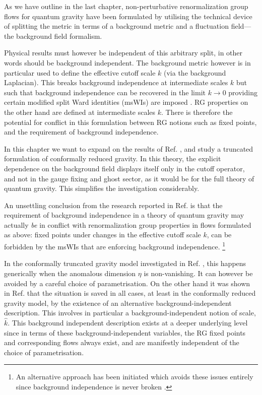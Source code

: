 \documentclass[11pt]{book} %
\numberwithin{equation}{chapter}
\begin{document}
As we have outline in the last chapter,
non-perturbative renormalization group flows for quantum gravity \cite{Reuter:1996cp}
have been formulated by utilising the technical device of splitting the metric in terms
of a background metric and a fluctuation field---the background field formalism.

Physical results must however be independent of this arbitrary split,
in other words should be background independent.
The background metric however is in particular used
to define the effective cutoff scale $k$ (via the background Laplacian).
This breaks background independence at intermediate scales $k$ but such that background
independence can be recovered in the limit $k\to0$ providing certain modified split Ward
identities (msWIs) are imposed
\cite{Pawlowski:2005xe, Litim:2002hj, Bridle:2013sra, Reuter:1997gx, Litim:1998nf, Litim:2002ce,
Manrique:2009uh, Manrique:2010mq, Manrique:2010am, Dietz:2015owa, Safari:2015dva}.
RG properties on the other hand are defined at intermediate scales $k$.
There is therefore the potential for conflict in this formulation between RG notions such as fixed points,
and the requirement of background independence.

In this chapter we want to expand on the results of Ref. \cite{Dietz:2015owa}, and study
a truncated formulation of conformally reduced gravity. In this theory, the explicit dependence
on the background field displays itself only in the cutoff operator, and not in the gauge
fixing and ghost sector, as it would be for the full theory of quantum gravity.
This simplifies the investigation considerably.

An unsettling conclusion from the research reported in Ref. \cite{Dietz:2015owa} is that the
requirement of background independence in a theory of quantum gravity may actually \textit{be}
in conflict with renormalization group properties in flows formulated as above:
fixed points under changes in the effective cutoff scale $k$, can be forbidden by the msWIs
that are enforcing background independence.%
\footnote{An alternative approach has been initiated which avoids
these issues entirely since background independence is never broken \cite{Morris:2016nda}.}

In the conformally truncated gravity model investigated in Ref. \cite{Dietz:2015owa},
this happens generically when the anomalous dimension $\eta$ is non-vanishing.
It can however be avoided by a careful choice of parametrisation.
On the other hand it was shown in Ref. \cite{Dietz:2015owa} that the situation is saved in all cases,
at least in the conformally reduced gravity model,
by the existence of an alternative background-independent description.
This involves in particular a background-independent notion of scale, $\hat{k}$.
This background independent description exists at a deeper underlying level since in terms
of these background-independent variables, the RG fixed points and corresponding flows always exist,
and are manifestly independent of the choice of parametrisation.
\end{document}
